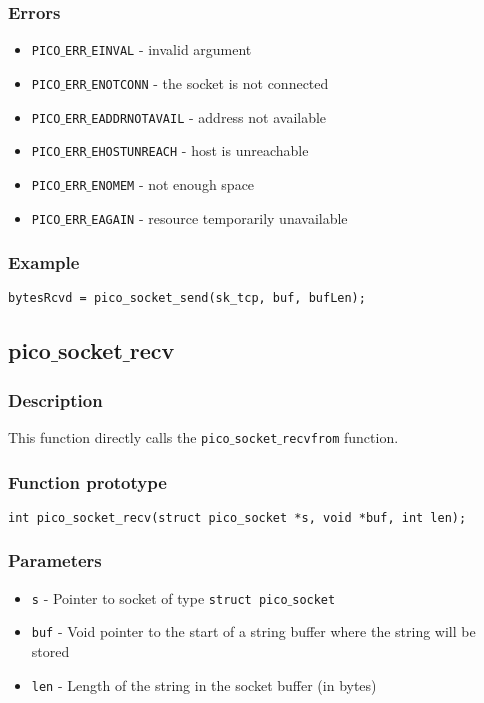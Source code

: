 \subsubsection*{Errors}
\begin{itemize}[noitemsep]
\item \texttt{PICO$\_$ERR$\_$EINVAL} - invalid argument
\item \texttt{PICO$\_$ERR$\_$ENOTCONN} - the socket is not connected
\item \texttt{PICO$\_$ERR$\_$EADDRNOTAVAIL} - address not available
\item \texttt{PICO$\_$ERR$\_$EHOSTUNREACH} - host is unreachable
\item \texttt{PICO$\_$ERR$\_$ENOMEM} - not enough space
\item \texttt{PICO$\_$ERR$\_$EAGAIN} - resource temporarily unavailable
\end{itemize}

\subsubsection*{Example}
\begin{verbatim}
bytesRcvd = pico_socket_send(sk_tcp, buf, bufLen);
\end{verbatim}


\subsection{pico$\_$socket$\_$recv}

\subsubsection*{Description}
This function directly calls the \texttt{pico$\_$socket$\_$recvfrom} function.

\subsubsection*{Function prototype}
\begin{verbatim}
int pico_socket_recv(struct pico_socket *s, void *buf, int len);
\end{verbatim}


\subsubsection*{Parameters}
\begin{itemize}[noitemsep]
\item \texttt{s} - Pointer to socket of type \texttt{struct pico$\_$socket}
\item \texttt{buf} - Void pointer to the start of a string buffer where the string will be stored
\item \texttt{len} - Length of the string in the socket buffer (in bytes)
\end{itemize}

